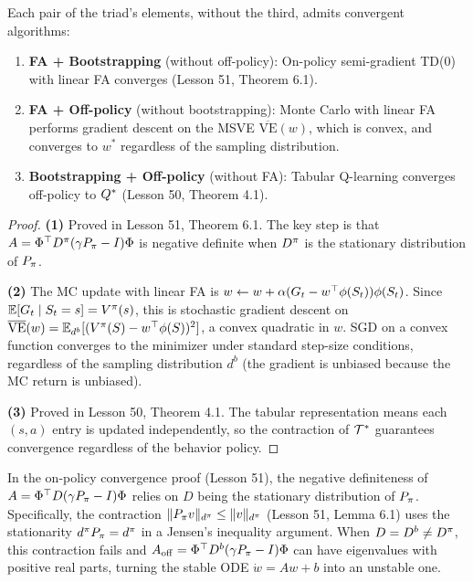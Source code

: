 \documentclass[11pt,a4paper]{article}
\begin{document}
\begin{keyresult}[title={Why Each Pair Is Safe}]
\begin{theorem}
\label{thm:pairs_safe}
Each pair of the triad's elements, without the third, admits
convergent algorithms:
\begin{enumerate}
  \item \textbf{FA + Bootstrapping} (without off-policy):
    On-policy semi-gradient TD(0) with linear FA converges
    (Lesson 51, Theorem 6.1).
  \item \textbf{FA + Off-policy} (without bootstrapping):
    Monte Carlo with linear FA performs gradient descent on the
    MSVE $\overline{\mathrm{VE}}(w)$, which is convex, and
    converges to $w^*$ regardless of the sampling distribution.
  \item \textbf{Bootstrapping + Off-policy} (without FA):
    Tabular Q-learning converges off-policy to $Q^*$
    (Lesson 50, Theorem 4.1).
\end{enumerate}
\end{theorem}
\end{keyresult}

\begin{proof}
\textbf{(1)} Proved in Lesson 51, Theorem 6.1. The key step is
that $A = \Phi^\top D^\pi(\gamma P_\pi - I)\Phi$ is
negative definite when $D^\pi$ is the stationary distribution
of $P_\pi$.

\textbf{(2)} The MC update with linear FA is
$w \leftarrow w + \alpha(G_t - w^\top\phi(S_t))\phi(S_t)$.
Since $\mathbb{E}[G_t \mid S_t = s] = V^\pi(s)$, this is
stochastic gradient descent on
$\overline{\mathrm{VE}}(w)
= \mathbb{E}_{d^b}[(V^\pi(S) - w^\top\phi(S))^2]$, a convex
quadratic in $w$. SGD on a convex function converges to the
minimizer under standard step-size conditions, regardless of the
sampling distribution $d^b$ (the gradient is unbiased because the
MC return is unbiased).

\textbf{(3)} Proved in Lesson 50, Theorem 4.1. The tabular
representation means each $(s,a)$ entry is updated independently,
so the contraction of $\mathcal{T}^*$ guarantees convergence regardless
of the behavior policy.
\end{proof}

\begin{remark}
\label{rem:root_cause}
In the on-policy convergence proof (Lesson 51), the negative
definiteness of $A = \Phi^\top D(\gamma P_\pi - I)\Phi$
relies on $D$ being the stationary distribution of $P_\pi$.
Specifically, the contraction $\|P_\pi v\|_{d^\pi} \leq
\|v\|_{d^\pi}$ (Lesson 51, Lemma 6.1) uses the stationarity
$d^\pi P_\pi = d^\pi$ in a Jensen's inequality argument.
When $D = D^b \neq D^\pi$, this contraction fails and
$A_{\mathrm{off}} = \Phi^\top D^b(\gamma P_\pi - I)\Phi$
can have eigenvalues with positive real parts, turning the stable
ODE $\dot{w} = Aw + b$ into an unstable one.
\end{remark}
\end{document}

